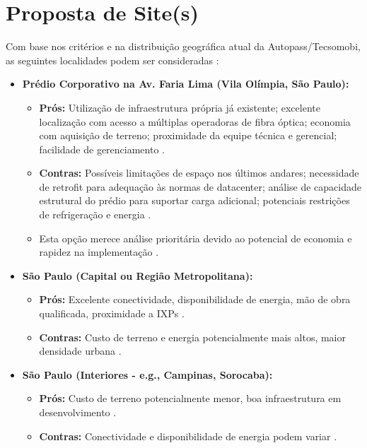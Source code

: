 \documentclass[
	12pt,				%
	oneside,			%
	a4paper,			%
	english,			%
	brazil				%
	]{abntex2unama}
\begin{document}
\section{Proposta de Site(s)}
Com base nos critérios e na distribuição geográfica atual da Autopass/Tecsomobi, as seguintes localidades podem ser consideradas \cite{modular_datacenters}:
\begin{itemize}
	\item \textbf{Prédio Corporativo na Av. Faria Lima (Vila Olímpia, São Paulo):}
	      \begin{itemize}
		      \item \textbf{Prós:} Utilização de infraestrutura própria já existente; excelente localização com acesso a múltiplas operadoras de fibra óptica; economia com aquisição de terreno; proximidade da equipe técnica e gerencial; facilidade de gerenciamento \cite{datacenter_monitoring}.
		      \item \textbf{Contras:} Possíveis limitações de espaço nos últimos andares; necessidade de retrofit para adequação às normas de datacenter; análise de capacidade estrutural do prédio para suportar carga adicional; potenciais restrições de refrigeração e energia \cite{cooling_technologies}.
		      \item Esta opção merece análise prioritária devido ao potencial de economia e rapidez na implementação \cite{dcim_systems}.
	      \end{itemize}
	\item \textbf{São Paulo (Capital ou Região Metropolitana):}
	      \begin{itemize}
		      \item \textbf{Prós:} Excelente conectividade, disponibilidade de energia, mão de obra qualificada, proximidade a IXPs \cite{network_fabric}.
		      \item \textbf{Contras:} Custo de terreno e energia potencialmente mais altos, maior densidade urbana \cite{energy_efficiency}.
	      \end{itemize}
	\item \textbf{São Paulo (Interiores - e.g., Campinas, Sorocaba):}
	      \begin{itemize}
		      \item \textbf{Prós:} Custo de terreno potencialmente menor, boa infraestrutura em desenvolvimento \cite{green_datacenters}.
		      \item \textbf{Contras:} Conectividade e disponibilidade de energia podem variar \cite{power_distribution}.
	      \end{itemize}

\end{itemize}
\end{document}

